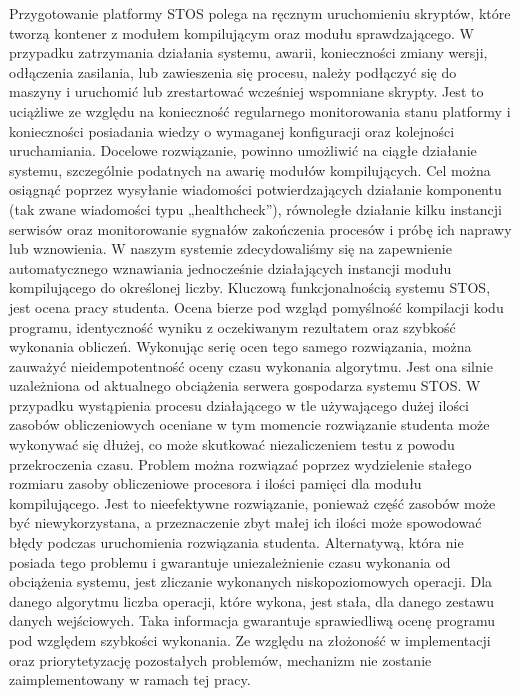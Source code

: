 \newline \indent Przygotowanie platformy STOS polega na ręcznym uruchomieniu skryptów, które tworzą kontener z modułem kompilującym oraz modułu sprawdzającego. W przypadku zatrzymania działania systemu, awarii, konieczności zmiany wersji, odłączenia zasilania, lub zawieszenia się procesu, należy podłączyć się do maszyny i uruchomić lub zrestartować wcześniej wspomniane skrypty. Jest to uciążliwe ze względu na konieczność regularnego monitorowania stanu platformy i konieczności posiadania wiedzy o wymaganej konfiguracji oraz kolejności uruchamiania. Docelowe rozwiązanie, powinno umożliwić na ciągłe działanie systemu, szczególnie podatnych na awarię modułów kompilujących. Cel można osiągnąć poprzez wysyłanie wiadomości potwierdzających działanie komponentu (tak zwane wiadomości typu „healthcheck”), równoległe działanie kilku instancji serwisów oraz monitorowanie sygnałów zakończenia procesów i próbę ich naprawy lub wznowienia. W naszym systemie zdecydowaliśmy się na zapewnienie automatycznego wznawiania jednocześnie działających instancji modułu kompilującego do określonej liczby.
\newline \indent Kluczową funkcjonalnością systemu STOS, jest ocena pracy studenta. Ocena bierze pod wzgląd pomyślność kompilacji kodu programu, identyczność wyniku z oczekiwanym rezultatem oraz szybkość wykonania obliczeń. Wykonując serię ocen tego samego rozwiązania, można zauważyć nieidempotentność oceny czasu wykonania algorytmu. Jest ona silnie uzależniona od aktualnego obciążenia serwera gospodarza systemu STOS. W przypadku wystąpienia procesu działającego w tle używającego dużej ilości zasobów obliczeniowych oceniane w tym momencie rozwiązanie studenta może wykonywać się dłużej, co może skutkować niezaliczeniem testu z powodu przekroczenia czasu. Problem można rozwiązać poprzez wydzielenie stałego rozmiaru zasoby obliczeniowe procesora i ilości pamięci dla modułu kompilującego. Jest to nieefektywne rozwiązanie, ponieważ część zasobów może być niewykorzystana, a przeznaczenie zbyt małej ich ilości może spowodować błędy podczas uruchomienia rozwiązania studenta. Alternatywą, która nie posiada tego problemu i gwarantuje uniezależnienie czasu wykonania od obciążenia systemu, jest zliczanie wykonanych niskopoziomowych operacji. Dla danego algorytmu liczba operacji, które wykona, jest stała, dla danego zestawu danych wejściowych. Taka informacja gwarantuje sprawiedliwą ocenę programu pod względem szybkości wykonania. Ze względu na złożoność w implementacji oraz priorytetyzację pozostałych problemów, mechanizm nie zostanie zaimplementowany w ramach tej pracy.